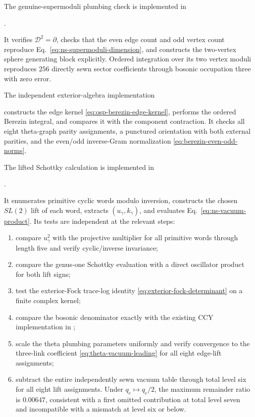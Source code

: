 \documentclass[11pt]{article}
\begin{document}
The genuine-supermoduli plumbing check is implemented in
\begin{center}
 .
\end{center}
It verifies \(\mathscr D^2=\partial\), checks that the even edge count and
odd vertex count reproduce Eq.~\eqref{eq:ns-supermoduli-dimension}, and
constructs the two-vertex sphere generating block explicitly.  Ordered
integration over its two vertex moduli reproduces \(256\) directly sewn
sector coefficients through bosonic occupation three with zero error.

The independent exterior-algebra implementation
\begin{center}
\end{center}
constructs the edge kernel \eqref{eq:osp-berezin-edge-kernel}, performs the
ordered Berezin integral, and compares it with the component contraction.  It
checks all eight theta-graph parity assignments, a punctured orientation with
both external parities, and the even/odd inverse-Gram normalization
\eqref{eq:berezin-even-odd-norms}.

The lifted Schottky calculation is implemented in
\begin{center}
 .
\end{center}
It enumerates primitive cyclic words modulo inversion, constructs the chosen
\(SL(2)\) lift of each word, extracts \((u_\gamma,k_\gamma)\), and evaluates
Eq.~\eqref{eq:ns-vacuum-product}.  Its tests are independent at the relevant
steps:
\begin{enumerate}
 \item compare \(u_\gamma^2\) with the projective multiplier for all
 primitive words through length five and verify cyclic/inverse invariance;
 \item compare the genus-one Schottky evaluation with a direct oscillator
 product for both lift signs;
 \item test the exterior-Fock trace-log identity
 \eqref{eq:exterior-fock-determinant} on a finite complex kernel;
 \item compare the bosonic denominator exactly with the existing CCY
 implementation in ;
 \item scale the theta plumbing parameters uniformly and verify convergence
 to the three-link coefficient \eqref{eq:theta-vacuum-leading} for all eight
 edge-lift assignments;
 \item subtract the entire independently sewn vacuum table through total
 level six for all eight lift assignments.  Under \(q_e\mapsto q_e/2\), the
 maximum remainder ratio is \(0.00647\), consistent with a first omitted
 contribution at total level seven and incompatible with a mismatch at level
 six or below.
\end{enumerate}
\end{document}
